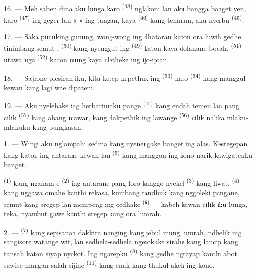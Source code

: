 \VUsaut{3.0mm}
\VUsaut{3.0mm}

16. --- Meh saben dina aku lunga karo 
\textsuperscript{(48)} nglakoni  lan aku bangga banget
yen, karo  \textsuperscript{(47)} ing geger lan
«  » ing tangan, kaya 
\textsuperscript{(46)} kang tenanan, aku nyerbu 
\textsuperscript{(45)}.

17. --- Saka pucuking gunung, wong-wong ing dhataran katon ora luwih
gedhe tinimbang semut ; 
\textsuperscript{(50)} kang nyenggut ing 
\textsuperscript{(49)} katon kaya dolanane bocah. 
\textsuperscript{(51)} utawa uga  \textsuperscript{(52)}
katon mung kaya cletheke ing ijo-ijoan.

18. --- Sajrone plesiran iku, kita kerep kepethuk ing  \textsuperscript{(53)} karo  \textsuperscript{(54)} kang manggul kewan kang lagi wae
dipateni.

19. --- Aku nyelehake ing herbariumku pange 
\textsuperscript{(55)} kang endah temen lan pang cilik 
\textsuperscript{(57)} kang abang mawar, kang dakpethik ing lawange
 \textsuperscript{(56)} cilik nalika mlaku-mlakuku kang
pungkasan.

\VUsaut{3.0mm}
\VUsaut{3.0mm}

\VUsaut{3.0mm}
\VUsaut{3.0mm}

1. --- Wingi aku nglampahi sedina kang nyenengake banget ing alas.
Kesregepan kang katon ing antarane kewan lan 
\textsuperscript{(5)} kang manggon ing kono narik kawigatenku banget.

 \textsuperscript{(1)} kang nganam e
\textsuperscript{(2)} ing antarane pang loro kanggo nyekel 
\textsuperscript{(3)} kang liwat,  \textsuperscript{(4)}
kang nggawa omahe kanthi rekasa, kumbang tandhuk kang nggoleki
pangane, semut kang sregep lan mempeng ing cedhake 
\textsuperscript{(6)} — kabeh kewan cilik iku lunga, teka, nyambut gawe
kanthi sregep kang ora lumrah.

2. ---  \textsuperscript{(7)} kang sepisanan dakkira
 nanging kang jebul mung 
lumrah, ndhelik ing sangisore watange wit, lan sedhela-sedhela
ngetokake sirahe kang lancip kang tansah katon siyap nyokot. Ing
ngarepku  \textsuperscript{(8)} kang gedhe ngrayap
kanthi abot sawise mangan salah sijine 
\textsuperscript{(11)} kang enak kang thukul akeh ing kono.

